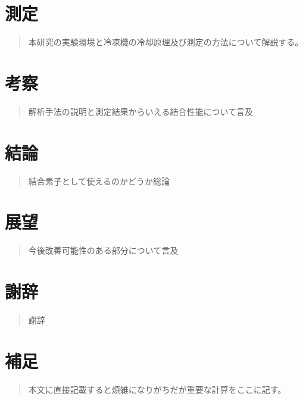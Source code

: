 \documentclass[uplatex,openany,oneside,a4j,11pt]{jsbook}
\begin{document}
\chapter{測定}
    \begin{abstract}
        本研究の実験環境と冷凍機の冷却原理及び測定の方法について解説する。
    \end{abstract}
    

\chapter{考察}
    \begin{abstract}
        解析手法の説明と測定結果からいえる結合性能について言及
    \end{abstract}
    

\chapter{結論}
    \begin{abstract}
        結合素子として使えるのかどうか総論
    \end{abstract}
    

\chapter{展望}
    \begin{abstract}
        今後改善可能性のある部分について言及
    \end{abstract}
    

\chapter{謝辞}
    \begin{abstract}
        謝辞
    \end{abstract}
    

\chapter{補足}
    \begin{abstract}
        本文に直接記載すると煩雑になりがちだが重要な計算をここに記す。
    \end{abstract}
    


%
\printbibliography[title=参考文献]
\end{document}
